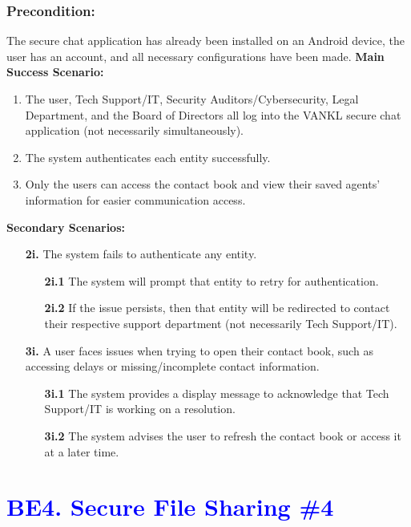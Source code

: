 \documentclass[]{article}
\begin{document}
\subsubsection*{Precondition:} The secure chat application has already been installed on an Android device, the user has an account, and all necessary configurations have been made.\newline\newline
\textbf{Main Success Scenario:}
\begin{enumerate}
	\item The user, Tech Support/IT, Security Auditors/Cybersecurity, Legal Department, and the Board of Directors all log into the VANKL secure chat application (not necessarily simultaneously).
	\item The system authenticates each entity successfully.
	\item Only the users can access the contact book and view their saved agents’ information for easier communication access.
\end{enumerate}
\textbf{Secondary Scenarios:}
\begin{enumerate}
	\item[\textbf{2i.}] The system fails to authenticate any entity.
		\begin{enumerate}
			\item[\textbf{2i.1}] The system will prompt that entity to retry for authentication.
			\item[\textbf{2i.2}] If the issue persists, then that entity will be redirected to contact their respective support department (not necessarily Tech Support/IT).
		\end{enumerate}
	\item[\textbf{3i.}] A user faces issues when trying to open their contact book, such as accessing delays or missing/incomplete contact information.
		\begin{enumerate}
			\item[\textbf{3i.1}] The system provides a display message to acknowledge that Tech Support/IT is working on a resolution.
			\item[\textbf{3i.2}] The system advises the user to refresh the contact book or access it at a later time.
		\end{enumerate}
\end{enumerate}

\section*{\textcolor{blue}{BE4. Secure File Sharing \#4}}
\end{document}
